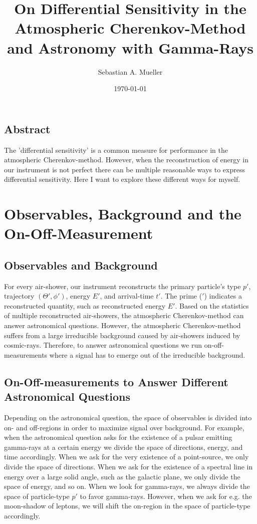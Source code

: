 \documentclass{article}%
\title{
    On Differential Sensitivity in the Atmospheric Cherenkov-Method and Astronomy with Gamma-Rays
}%
\author{Sebastian A. Mueller}%
\date{\today{}}%
\begin{document}
%
\maketitle%
%
\newcommand{\dd}[2]{\frac{\mathrm{d}#1}{\mathrm{d}#2}}
%
\subsection*{Abstract}
The 'differential sensitivity' is a common measure for performance in the atmospheric Cherenkov-method.
%
However, when the reconstruction of energy in our instrument is not perfect there can be multiple reasonable ways to express differential sensitivity.
%
Here I want to explore these different ways for myself.
%
\section{Observables, Background and the On-Off-Measurement}
\label{SecObservablesAndOnOff}
\subsection*{Observables and Background}
%
For every air-shower, our instrument reconstructs the primary particle's type $p'$, trajectory $(\Theta', \phi')$, energy $E'$, and arrival-time $t'$.
%
The prime ($'$) indicates a reconstructed quantity, such as reconstructed energy $E'$.
%
Based on the statistics of multiple reconstructed air-showers, the atmospheric Cherenkov-method can answer astronomical questions.
%
However, the atmospheric Cherenkov-method suffers from a large irreducible background caused by air-showers induced by cosmic-rays.
%
Therefore, to answer astronomical questions we run on-off-measurements where a signal has to emerge out of the irreducible background.
%
\subsection*{On-Off-measurements to Answer Different Astronomical Questions}
Depending on the astronomical question, the space of observables is divided into on- and off-regions in order to maximize signal over background.
%
For example, when the astronomical question asks for the existence of a pulsar emitting gamma-rays at a certain energy we divide the space of directions, energy, and time accordingly.
%
When we ask for the very existence of a point-source, we only divide the space of directions.
%
When we ask for the existence of a spectral line in energy over a large solid angle, such as the galactic plane, we only divide the space of energy, and so on.
%
When we look for gamma-rays, we always divide the space of particle-type $p'$ to favor gamma-rays.
%
However, when we ask for e.g. the moon-shadow of leptons, we will shift the on-region in the space of particle-type accordingly.
%
\end{document}
